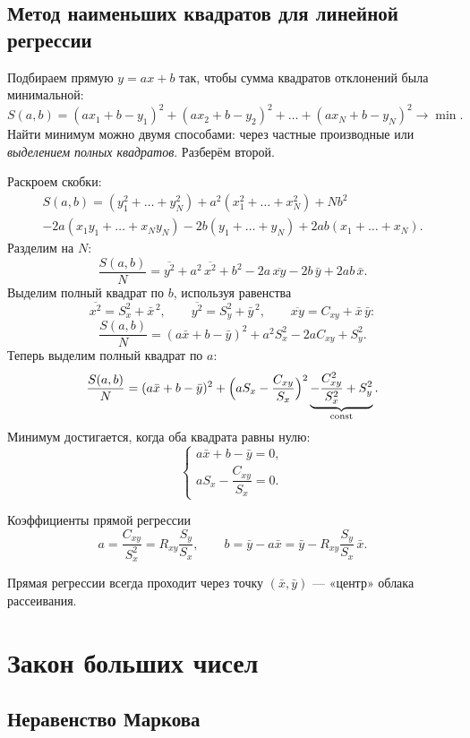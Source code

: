 \documentclass[11pt,a4paper]{article}
\begin{document}
\subsection{Метод наименьших квадратов для линейной регрессии}
Подбираем прямую $y=ax+b$ так, чтобы сумма квадратов отклонений была минимальной:
\[
S(a,b)=(ax_1+b-y_1)^2+(ax_2+b-y_2)^2+\dots+(ax_N+b-y_N)^2\longrightarrow\min.
\]
Найти минимум можно двумя способами: через частные производные или \emph{выделением полных квадратов}. Разберём второй.

Раскроем скобки:
\begin{multline*}
S(a,b)=(y_1^2+\dots+y_N^2)+a^2(x_1^2+\dots+x_N^2)+Nb^2\\
-2a(x_1y_1+\dots+x_Ny_N)-2b(y_1+\dots+y_N)+2ab(x_1+\dots+x_N).
\end{multline*}
Разделим на $N$:
\[
\frac{S(a,b)}{N}=\overline{y^2}+a^2\,\overline{x^2}+b^2-2a\,\overline{xy}-2b\,\bar y+2ab\,\bar x.
\]
Выделим полный квадрат по $b$, используя равенства
\[
\overline{x^2}=S_x^2+\bar x^{\,2},\qquad \overline{y^2}=S_y^2+\bar y^{\,2},\qquad \overline{xy}=C_{xy}+\bar x\,\bar y:
\]
\[
\frac{S(a,b)}{N}=(a\bar x+b-\bar y)^2+a^2S_x^2-2aC_{xy}+S_y^2.
\]
Теперь выделим полный квадрат по $a$:
\[
\frac{S(a,b)}{N}=(a\bar x+b-\bar y)^2+\Bigl(aS_x-\frac{C_{xy}}{S_x}\Bigr)^2\underbrace{-\frac{C_{xy}^2}{S_x^2}+S_y^2}_{\mathrm{const}}.
\]
Минимум достигается, когда оба квадрата равны нулю:
\[
\begin{cases}
a\bar x+b-\bar y=0,\\[2pt]
aS_x-\dfrac{C_{xy}}{S_x}=0.
\end{cases}
\]

\begin{kvb}{Коэффициенты прямой регрессии}
\[
a=\frac{C_{xy}}{S_x^2}=R_{xy}\frac{S_y}{S_x},\qquad b=\bar y-a\bar x=\bar y-R_{xy}\frac{S_y}{S_x}\,\bar x.
\]
\end{kvb}

\begin{zam}
Прямая регрессии всегда проходит через точку $(\bar x,\bar y)$ — «центр» облака рассеивания.
\end{zam}

\section{Закон больших чисел}

\subsection{Неравенство Маркова}
\end{document}
